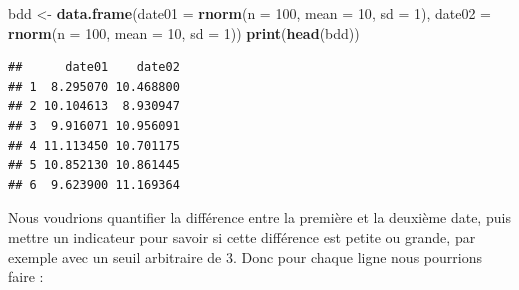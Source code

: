 \documentclass[
]{book}
\newenvironment{Shaded}{\begin{snugshade}}{\end{snugshade}}
\newcommand{\DataTypeTok}[1]{\textcolor[rgb]{0.13,0.29,0.53}{#1}}
\newcommand{\DecValTok}[1]{\textcolor[rgb]{0.00,0.00,0.81}{#1}}
\newcommand{\KeywordTok}[1]{\textcolor[rgb]{0.13,0.29,0.53}{\textbf{#1}}}
\newcommand{\NormalTok}[1]{#1}
\newcommand{\StringTok}[1]{\textcolor[rgb]{0.31,0.60,0.02}{#1}}
\begin{document}
\begin{Shaded}
\begin{Highlighting}[]
\NormalTok{bdd <-}\StringTok{ }\KeywordTok{data.frame}\NormalTok{(}\DataTypeTok{date01 =} \KeywordTok{rnorm}\NormalTok{(}\DataTypeTok{n =} \DecValTok{100}\NormalTok{, }\DataTypeTok{mean =} \DecValTok{10}\NormalTok{, }\DataTypeTok{sd =} \DecValTok{1}\NormalTok{), }
                  \DataTypeTok{date02 =} \KeywordTok{rnorm}\NormalTok{(}\DataTypeTok{n =} \DecValTok{100}\NormalTok{, }\DataTypeTok{mean =} \DecValTok{10}\NormalTok{, }\DataTypeTok{sd =} \DecValTok{1}\NormalTok{))}
\KeywordTok{print}\NormalTok{(}\KeywordTok{head}\NormalTok{(bdd))}
\end{Highlighting}
\end{Shaded}

\begin{verbatim}
##      date01    date02
## 1  8.295070 10.468800
## 2 10.104613  8.930947
## 3  9.916071 10.956091
## 4 11.113450 10.701175
## 5 10.852130 10.861445
## 6  9.623900 11.169364
\end{verbatim}

Nous voudrions quantifier la différence entre la première et la deuxième date, puis mettre un indicateur pour savoir si cette différence est petite ou grande, par exemple avec un seuil arbitraire de 3. Donc pour chaque ligne nous pourrions faire :
\end{document}
